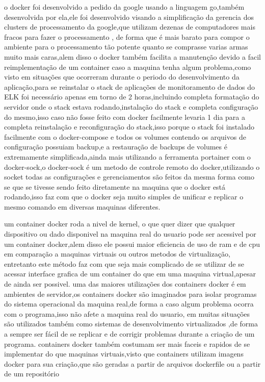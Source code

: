 \documentclass[
	12pt,				%
	openright,			%
	oneside,			%
	a4paper,			%
	english,			%
	french,				%
	spanish,			%
	brazil,				%
	]{abntex2}
\begin{document}
o docker foi desenvolvido a pedido da google usando a linguagem go,também desenvolvida por ela,ele foi desenvolvido visando a simplificação da gerencia dos clusters de processamento da google,que utilizam dezenas de computadores mais fracos para fazer o processamento , de forma que é mais barato para compor o ambiente para o processamento tão potente quanto se comprasse varias armas muito mais caras,alem disso o docker também facilita a manutenção devido a facil reimplementação de um container caso a maquina tenha algum problema,como visto em situações que ocorreram durante o periodo do desenvolvimento da aplicação,para se reinstalar o stack de aplicações de monitoramento de dados do ELK  foi necessário apenas em torno de 2 horas,incluindo completa formatação do servidor onde o stack estava rodando,instalação do stack e completa configuração do mesmo,isso caso não fosse feito com docker facilmente levaria 1 dia para a completa reinstalação e reconfiguração do stack,isso porque o stack foi instalado facilmente com o docker-compose e todos os volumes contendo os arquivos de configuração possuiam backup,e a restauração de backups de volumes é extremamente simplificada,ainda mais utilizando a ferramenta portainer  com o docker-sock,o docker-sock é um metodo de controle remoto do docker,utilizando o socket todas as configurações e gerenciamentos são feitos da mesma forma como se que se tivesse sendo feito diretamente na maquina que o docker está rodando,isso faz com que o docker seja muito simples de unificar e replicar o mesmo comando em diversas maquinas diferentes.

um container docker roda a nivel de kernel, o que quer dizer que qualquer dispositivo ou dado disponivel na maquina real do usuario pode ser acessivel por um container docker,alem disso ele possui maior eficiencia de uso de ram e de cpu em comparação a maquinas virtuais ou outros metodos de virtualização, entretanto este método faz com que seja mais complicado de se utilizar de se acessar interface grafica de um container do que em uma maquina virtual,apesar de ainda ser possivel.
uma das maiores utilizações dos containers docker é em ambientes de servidor,os containers docker são imaginados para isolar programas do sistema operacional da maquina real,de forma a caso algum problema ocorra com o programa,isso não afete a maquina real do usuario, em muitas situações são utilizados também como sistemas de desenvolvimento virtualizados ,de forma a sempre ser fácil de se replicar e de corrigir problemas durante a criação de um programa.
containers docker também costumam ser mais faceis e rapidos de se implementar do que maquinas virtuais,visto que containers utilizam imagens docker para sua criação,que são geradas a partir de arquivos dockerfile ou a partir de um repositório
\end{document}
